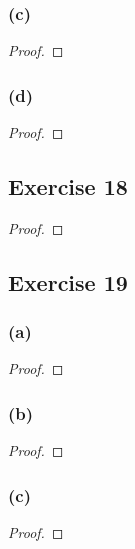 \documentclass[14pt]{extarticle}
\begin{document}
\subsubsection{(c)}

\begin{proof}

\end{proof}

\subsubsection{(d)}

\begin{proof}

\end{proof}

\subsection{Exercise 18}

\begin{proof}

\end{proof}

\subsection{Exercise 19}

\subsubsection{(a)}

\begin{proof}

\end{proof}

\subsubsection{(b)}

\begin{proof}

\end{proof}

\subsubsection{(c)}

\begin{proof}

\end{proof}
\end{document}
